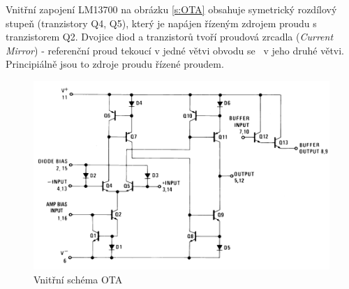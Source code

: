 \noindent Vnitřní zapojení LM13700 na obrázku \ref{s:OTA} obsahuje symetrický rozdílový stupeň (tranzistory Q4, Q5), který je napájen řízeným zdrojem proudu s tranzistorem Q2. Dvojice diod a tranzistorů tvoří proudová zrcadla (\textit{Current Mirror}) - referenční proud tekoucí v jedné větvi obvodu se  ~v jeho druhé větvi. Principiálně jsou to zdroje proudu řízené proudem. 
\begin{figure}[h]
\centering
\includegraphics[scale=0.75]{image5.png}
\caption[Vnitřní schéma OTA]{Vnitřní schéma OTA \cite{10}\label{sec:OTA}}
\end{figure}